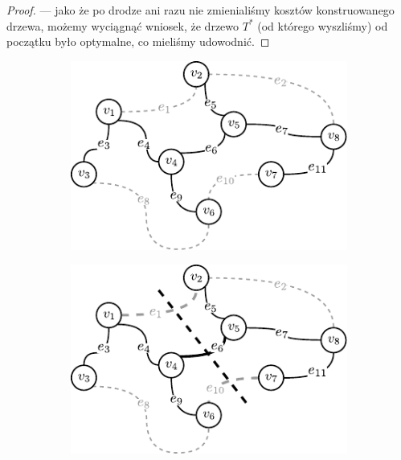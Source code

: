 \begin{proof}
--- jako że po drodze ani razu nie zmienialiśmy kosztów konstruowanego drzewa, możemy wyciągnąć wniosek, że drzewo $T^{\ast}$ (od którego wyszliśmy) od początku było optymalne, co mieliśmy udowodnić.
\end{proof}

\begin{figure}[!htbp]
	\null\hfill
	\begin{subfigure}[b]{0.3\textwidth}
		\includegraphics[width=\textwidth]{Chapter_I/CUT-example/a}
		\caption{}
		\label{fig:cut:a}
	\end{subfigure}
	\hfill
	\begin{subfigure}[b]{0.3\textwidth}
		\includegraphics[width=\textwidth]{Chapter_I/CUT-example/b}
		\caption{}
		\label{fig:cut:b}
	\end{subfigure}
	\hfill
	\begin{subfigure}[b]{0.3\textwidth}

\end{subfigure}
\end{figure}
